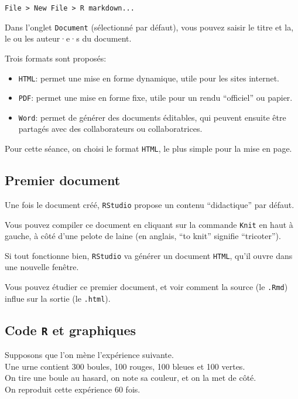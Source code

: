 \documentclass[
]{article}
\begin{document}
\begin{verbatim}
File > New File > R markdown...
\end{verbatim}

Dans l'onglet \texttt{Document} (sélectionné par défaut), vous pouvez
saisir le titre et la, le ou les auteur·e·s du document.

Trois formats sont proposés:

\begin{itemize}
\item
  \texttt{HTML}: permet une mise en forme dynamique, utile pour les
  sites internet.
\item
  \texttt{PDF}: permet une mise en forme fixe, utile pour un rendu
  ``officiel'' ou papier.
\item
  \texttt{Word}: permet de générer des documents éditables, qui peuvent
  ensuite être partagés avec des collaborateurs ou collaboratrices.
\end{itemize}

Pour cette séance, on choisi le format \texttt{HTML}, le plus simple
pour la mise en page.

\hypertarget{premier-document}{%
\subsection{Premier document}\label{premier-document}}

Une fois le document créé, \texttt{RStudio} propose un contenu
``didactique'' par défaut.

Vous pouvez compiler ce document en cliquant sur la commande
\texttt{Knit} en haut à gauche, à côté d'une pelote de laine (en
anglais, ``to knit'' signifie ``tricoter'').

Si tout fonctionne bien, \texttt{RStudio} va générer un document
\texttt{HTML}, qu'il ouvre dans une nouvelle fenêtre.

Vous pouvez étudier ce premier document, et voir comment la source (le
\texttt{.Rmd}) influe sur la sortie (le \texttt{.html}).

\hypertarget{code-r-et-graphiques}{%
\subsection{\texorpdfstring{Code \texttt{R} et
graphiques}{Code R et graphiques}}\label{code-r-et-graphiques}}

Supposons que l'on mène l'expérience suivante.\\
Une urne contient 300 boules, 100 rouges, 100 bleues et 100 vertes.\\
On tire une boule au hasard, on note sa couleur, et on la met de côté.\\
On reproduit cette expérience 60 fois.
\end{document}
